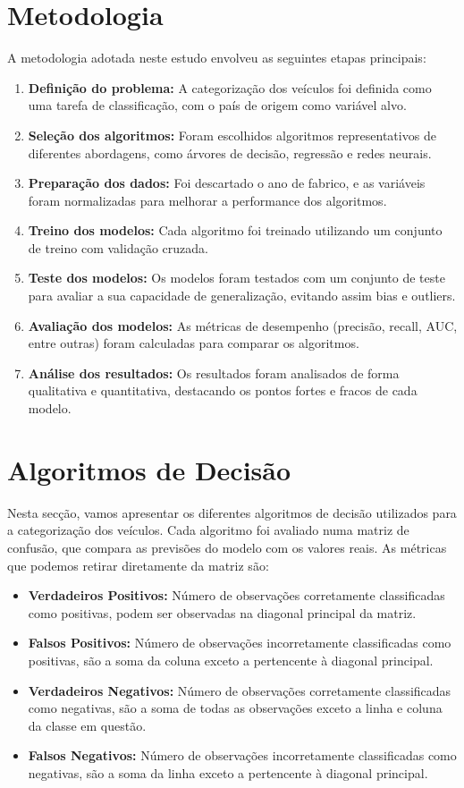 \documentclass[conference]{IEEEtran}
\begin{document}
\section{Metodologia}
A metodologia adotada neste estudo envolveu as seguintes etapas principais:
\begin{enumerate}
	\item \textbf{Definição do problema:} A categorização dos veículos foi definida como uma tarefa de classificação, com o país de origem como variável alvo.
	\item \textbf{Seleção dos algoritmos:} Foram escolhidos algoritmos representativos de diferentes abordagens, como árvores de decisão, regressão e redes neurais.
	\item \textbf{Preparação dos dados:} Foi descartado o ano de fabrico, e as variáveis foram normalizadas para melhorar a performance dos algoritmos.
	\item \textbf{Treino dos modelos:} Cada algoritmo foi treinado utilizando um conjunto de treino com validação cruzada.
	\item \textbf{Teste dos modelos:} Os modelos foram testados com um conjunto de teste para avaliar a sua capacidade de generalização, evitando assim bias
	      e outliers.
	\item \textbf{Avaliação dos modelos:} As métricas de desempenho (precisão, recall, AUC, entre outras) foram calculadas para comparar os algoritmos.
	\item \textbf{Análise dos resultados:} Os resultados foram analisados de forma qualitativa e quantitativa, destacando os pontos fortes e fracos de cada modelo.
\end{enumerate}

\section{Algoritmos de Decisão}
Nesta secção, vamos apresentar os diferentes algoritmos de decisão utilizados para a categorização dos veículos. Cada algoritmo foi avaliado numa matriz
de confusão, que compara as previsões do modelo com os valores reais. As métricas que podemos retirar diretamente da matriz são:
\begin{itemize}
	\item \textbf{Verdadeiros Positivos:} Número de observações corretamente classificadas como positivas, podem ser observadas na diagonal principal da matriz.
	\item \textbf{Falsos Positivos:} Número de observações incorretamente classificadas como positivas, são a soma da coluna exceto a pertencente à diagonal principal.
	\item \textbf{Verdadeiros Negativos:} Número de observações corretamente classificadas como negativas, são a soma de todas as observações exceto a linha e coluna
	      da classe em questão.
	\item \textbf{Falsos Negativos:} Número de observações incorretamente classificadas como negativas, são a soma da linha exceto a pertencente à diagonal principal.
\end{itemize}
\end{document}

